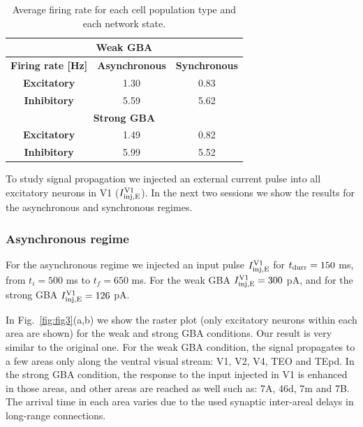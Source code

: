 \begin{table}[h!]
\centering
\begin{tabular}{|ccc|}
\hline
\multicolumn{3}{|c|}{\textbf{Weak GBA}}                                                                                 \\ \hline
\multicolumn{1}{|c|}{\textbf{Firing rate {[}Hz{]}}} & \multicolumn{1}{c|}{\textbf{Asynchronous}} & \textbf{Synchronous} \\ \hline
\multicolumn{1}{|c|}{\textbf{Excitatory}}           & \multicolumn{1}{c|}{1.30}                  & 0.83                 \\ \hline
\multicolumn{1}{|c|}{\textbf{Inhibitory}}           & \multicolumn{1}{c|}{5.59}                  & 5.62                 \\ \hline
\multicolumn{3}{|c|}{\textbf{Strong GBA}}                                                                               \\ \hline
\multicolumn{1}{|c|}{\textbf{Excitatory}}           & \multicolumn{1}{c|}{1.49}                  & 0.82                 \\ \hline
\multicolumn{1}{|c|}{\textbf{Inhibitory}}           & \multicolumn{1}{c|}{5.99}                  & 5.52                 \\ \hline
\end{tabular}
\caption{Average firing rate for each cell population type and each network state.}\label{tab:rates}
\end{table}

To study signal propagation we injected an external current pulse into all excitatory neurons in V1 ($I_{\rm inj, E}^{\rm V1}$). In the next two sessions we show the results for the asynchronous and synchronous regimes.

\subsubsection{Asynchronous regime}\label{asyncreg}

For the asynchronous regime we injected an input pulse $I_{\rm inj, E}^{\rm V1}$ for $t_{\rm durr} = 150$ ms, from $t_{i} = 500$ ms to $t_{f} = 650$ ms. For the weak GBA $I_{\rm inj, E}^{\rm V1} = 300$ pA, and for the strong GBA $I_{\rm inj, E}^{\rm V1} = 126$ pA.

In Fig.~\ref{fig:fig3}(a,b) we show the raster plot (only excitatory neurons within each area are shown) for the weak and strong GBA conditions. Our result is very similar to the original one. For the weak GBA condition, the signal propagates to a few areas only along the ventral visual stream: V1, V2, V4, TEO and TEpd. In the strong GBA condition, the response to the input injected in V1 is enhanced in those areas, and other areas are reached as well such as: 7A, 46d, 7m and 7B. The arrival time in each area varies due to the used synaptic inter-areal delays in long-range connections.

